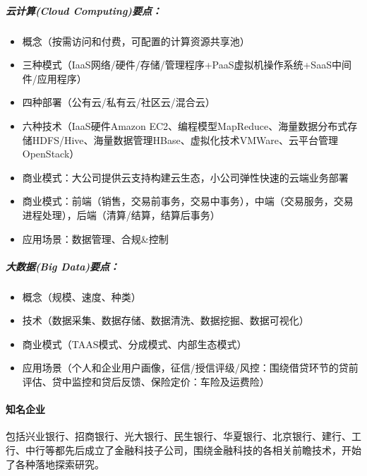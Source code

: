 \documentclass[letterpaper,10pt,english]{sphinxmanual}
\begin{document}
\subparagraph{云计算(Cloud Computing)要点：}
\label{\detokenize{chapter_AI+Finance/FinTech:cloud-computing}}\begin{itemize}
\item {} 
概念（按需访问和付费，可配置的计算资源共享池）

\item {} 
三种模式（IaaS网络/硬件/存储/管理程序+PaaS虚拟机操作系统+SaaS中间件/应用程序）

\item {} 
四种部署（公有云/私有云/社区云/混合云）

\item {} 
六种技术（IaaS硬件Amazon
EC2、编程模型MapReduce、海量数据分布式存储HDFS/Hive、海量数据管理HBase、虚拟化技术VMWare、云平台管理OpenStack）

\item {} 
商业模式：大公司提供云支持构建云生态，小公司弹性快速的云端业务部署

\item {} 
商业模式：前端（销售，交易前事务，交易中事务），中端（交易服务，交易进程处理），后端（清算/结算，结算后事务）

\item {} 
应用场景：数据管理、合规\&控制

\end{itemize}


\subparagraph{大数据(Big Data)要点：}
\label{\detokenize{chapter_AI+Finance/FinTech:big-data}}\begin{itemize}
\item {} 
概念（规模、速度、种类）

\item {} 
技术（数据采集、数据存储、数据清洗、数据挖掘、数据可视化）

\item {} 
商业模式（TAAS模式、分成模式、内部生态模式）

\item {} 
应用场景（个人和企业用户画像，征信/授信评级/风控：围绕借贷环节的贷前评估、贷中监控和贷后反馈、保险定价：车险及运费险）

\end{itemize}


\paragraph{知名企业}
\label{\detokenize{chapter_AI+Finance/FinTech:id12}}
包括兴业银行、招商银行、光大银行、民生银行、华夏银行、北京银行、建行、工行、中行等都先后成立了金融科技子公司，围绕金融科技的各相关前瞻技术，开始了各种落地探索研究。%
\begin{footnote}[1098]\sphinxAtStartFootnote
{}
%
\end{footnote}
\end{document}
